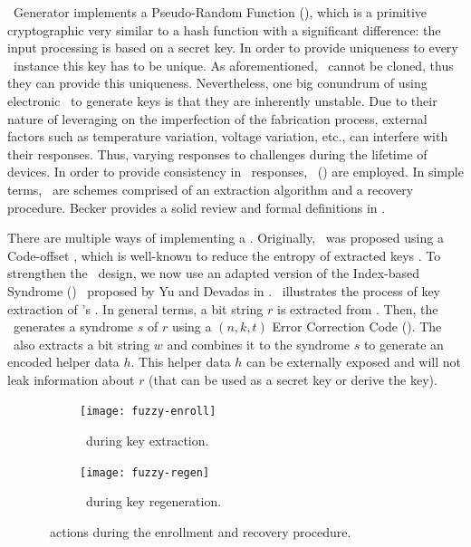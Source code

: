 \ptag~Generator implements a Pseudo-Random Function (\prf), which is a primitive cryptographic very similar to a hash function with a significant difference: the input processing is based on a secret key. In order to provide uniqueness to every \cshia~instance this key has to be unique. As aforementioned, \pufs~cannot be cloned, thus they can provide this uniqueness. Nevertheless, one big conundrum of using electronic \pufs~to generate keys is that they are inherently unstable. Due to their nature of leveraging on the imperfection of the fabrication process, external factors such as temperature variation, voltage variation, etc., can interfere with their responses. Thus, varying responses to challenges during the lifetime of devices. In order to provide consistency in \puf~responses, \fuzzy~(\fe) are employed. In simple terms, \fes~are schemes comprised of an extraction algorithm and a recovery procedure. Becker provides a solid review and formal definitions in \cite{Becker2017:RobustFuzzyExtractor}.

There are multiple ways of implementing a \fuzzy. Originally, \cshia~was proposed using a Code-offset \fe, which is well-known to reduce the entropy of extracted keys \cite{Armknecht2011:Formalization}. To strengthen the \cshia~design, we now use an adapted version of the Index-based Syndrome (\ibs) \fe~proposed by Yu and Devadas in \cite{Yu2010:RobustErrorCorrection}. \fenroll~illustrates the process of key extraction of \cshia's \fe. In general terms, a bit string $r$ is extracted from \pufs. Then, the \fe~generates a syndrome $s$ of $r$ using a $(n,k,t)$ Error Correction Code (\ecc). The \fe~also extracts a bit string $w$ and combines it to the syndrome $s$ to generate an encoded helper data $h$. This helper data $h$ can be externally exposed and will not leak information about $r$ (that can be used as a secret key or derive the key).


\begin{figure}
     \centering
     \begin{subfigure}[b]{0.5\textwidth}
         \centering
         \texttt{[image: fuzzy-enroll]}
         \caption{\fuzzy~during key extraction.}
         \label{fig:fuzzy-enroll}
     \end{subfigure}
     \hfill
     \begin{subfigure}[b]{0.5\textwidth}
         \centering
         \texttt{[image: fuzzy-regen]}
         \caption{\fuzzy~during key regeneration.}
         \label{fig:fuzzy-regen}
     \end{subfigure}

        \caption{\fuzzy~actions during the enrollment and recovery procedure.}
        \label{fig:fuzzy-extractor}
\end{figure}

